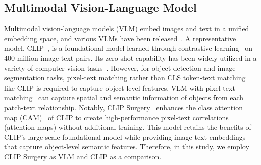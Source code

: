\subsection{Multimodal Vision-Language Model}
Multimodal vision-language models (VLM) embed images and text in a unified embedding space, and various VLMs have been released~\cite{CLIP, CoCa, ALIGN, BLIP, G-DINO, FIS, PFIS}. A representative model, CLIP~\cite{CLIP}, is a foundational model learned through contrastive learning~\cite{contrastive, Vilbert} on 400 million image-text pairs. Its zero-shot capability has been widely utilized in a variety of computer vision tasks~\cite{StableDiffusion, CoOp, GLIP, Clip4clip, Wav2clip, LARE, PointCLIP}. However, for object detection and image segmentation tasks, pixel-text matching rather than CLS token-text matching like CLIP is required to capture object-level features. VLM with pixel-text matching~\cite{CLIP-Surgery, OWL-ViT, Denseclip, Zegclip} can capture spatial and semantic information of objects from each patch-text relationship. Notably, CLIP Surgery~\cite{CLIP-Surgery} enhances the class attention map (CAM)~\cite{cam, Grad-cam, Clims, CLIP-ES} of CLIP to create high-performance pixel-text correlations (attention maps) without additional training. This model retains the benefits of CLIP's large-scale foundational model while providing image-text embeddings that capture object-level semantic features. Therefore, in this study, we employ CLIP Surgery as VLM and CLIP as a comparison.

